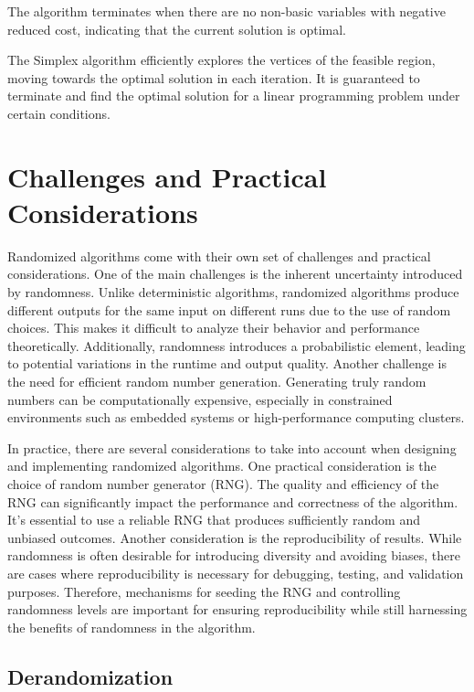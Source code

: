 \documentclass[12pt]{book} %
\begin{document}
The algorithm terminates when there are no non-basic variables with negative reduced cost, indicating that the current solution is optimal.

The Simplex algorithm efficiently explores the vertices of the feasible region, moving towards the optimal solution in each iteration. It is guaranteed to terminate and find the optimal solution for a linear programming problem under certain conditions.


\section{Challenges and Practical Considerations}

Randomized algorithms come with their own set of challenges and practical considerations. One of the main challenges is the inherent uncertainty introduced by randomness. Unlike deterministic algorithms, randomized algorithms produce different outputs for the same input on different runs due to the use of random choices. This makes it difficult to analyze their behavior and performance theoretically. Additionally, randomness introduces a probabilistic element, leading to potential variations in the runtime and output quality. Another challenge is the need for efficient random number generation. Generating truly random numbers can be computationally expensive, especially in constrained environments such as embedded systems or high-performance computing clusters.

In practice, there are several considerations to take into account when designing and implementing randomized algorithms. One practical consideration is the choice of random number generator (RNG). The quality and efficiency of the RNG can significantly impact the performance and correctness of the algorithm. It's essential to use a reliable RNG that produces sufficiently random and unbiased outcomes. Another consideration is the reproducibility of results. While randomness is often desirable for introducing diversity and avoiding biases, there are cases where reproducibility is necessary for debugging, testing, and validation purposes. Therefore, mechanisms for seeding the RNG and controlling randomness levels are important for ensuring reproducibility while still harnessing the benefits of randomness in the algorithm.

\subsection{Derandomization}
\end{document}
